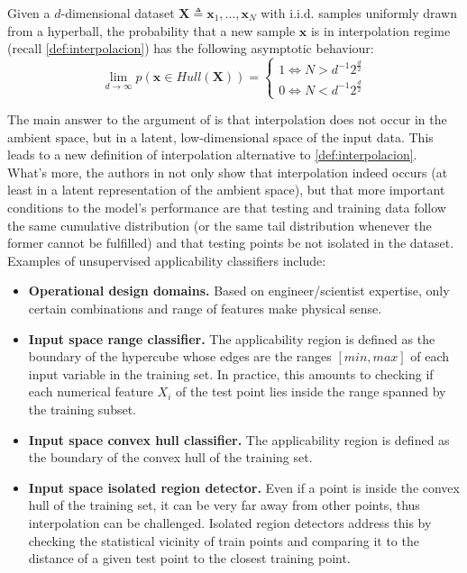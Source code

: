 \begin{theorem}\cite{barany1988shape}\label{dparadoxa}
	Given a $d$-dimensional dataset $\mathbf X \triangleq {\mathbf{x}_1,...,\mathbf{x}_N}$ with i.i.d. samples uniformly drawn from a hyperball, the probability that a new sample $\mathbf{x}$ is in interpolation regime (recall \autoref{def:interpolacion}) has the following asymptotic behaviour:\\
	
	\begin{equation}
		\lim_{d \to \infty}p(\mathbf{x}\in Hull(\mathbf{X}))=
		\begin{cases}
			1 \iff N>d^{-1}2^{\frac{d}{2}}\\
			0 \iff N<d^{-1}2^{\frac{d}{2}}
		\end{cases}	
	\end{equation}
\end{theorem}

\indent The main answer to the argument of \cite{balestriero2021learning} is that interpolation does not occur in the ambient space, but in a latent, low-dimensional space of the input data\cite{bonnasse2022interpolation}. This leads to a new definition of interpolation alternative to \autoref{def:interpolacion}.\\
%
\indent What's more, the authors in \cite{bonnasse2022interpolation} not only show that interpolation indeed occurs (at least in a latent representation of the ambient space), but that more important conditions to the model's performance are that testing and training data follow the same cumulative distribution (or the same tail distribution whenever the former cannot be fulfilled) and that testing points be not isolated in the dataset.\\
%
Examples of unsupervised applicability classifiers include:
\begin{itemize}
	\item \textbf{Operational design domains.} Based on engineer/scientist expertise, only certain combinations and range of features make physical sense.
	\item \textbf{Input space range classifier.} The applicability region is defined as the boundary of the hypercube whose edges are the ranges $[min, max]$ of each input variable in the training set. In practice, this amounts to checking if each numerical feature $X_i$ of the test point lies inside the range spanned by the training subset.
	\item \textbf{Input space convex hull classifier.} The applicability region is defined as the boundary of the convex hull of the training set.
	\item \textbf{Input space isolated region detector.} Even if a point is inside the convex hull of the training set, it can be very far away from other points, thus interpolation can be challenged. Isolated region detectors address this by checking the statistical vicinity of train points and comparing it to the distance of a given test point to the closest training point.
\end{itemize}

